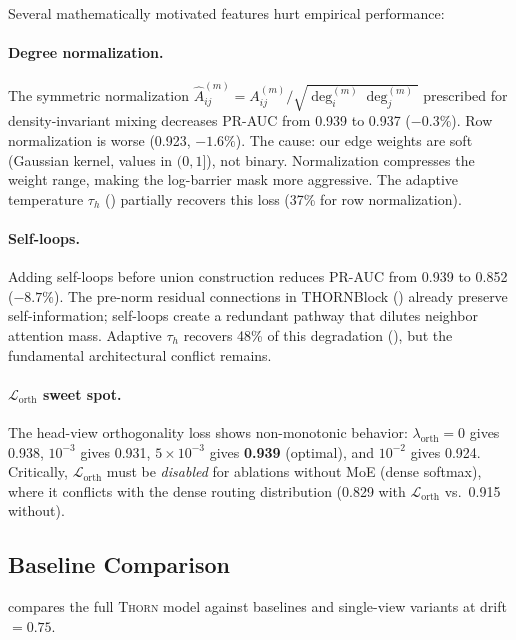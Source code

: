 \documentclass[11pt,a4paper]{article}
\newcommand{\thorn}{\textsc{Thorn}}
\newcommand{\calL}{\mathcal{L}}
\begin{document}
Several mathematically motivated features hurt empirical performance:

\paragraph{Degree normalization.}
The symmetric normalization
$\hat{A}_{ij}^{(m)} = A_{ij}^{(m)} / \sqrt{\deg_i^{(m)} \deg_j^{(m)}}$
prescribed for density-invariant mixing decreases PR-AUC from 0.939 to
0.937 ($-0.3\%$).
Row normalization is worse (0.923, $-1.6\%$).
The cause: our edge weights are soft (Gaussian kernel, values in
$(0, 1]$), not binary.
Normalization compresses the weight range, making the
log-barrier mask more aggressive.
The adaptive temperature $\tau_h$ () partially
recovers this loss (37\% for row normalization).

\paragraph{Self-loops.}
Adding self-loops before union construction reduces PR-AUC from 0.939 to
0.852 ($-8.7\%$).
The pre-norm residual connections in THORNBlock
() already preserve self-information; self-loops
create a redundant pathway that dilutes neighbor attention mass.
Adaptive $\tau_h$ recovers 48\% of this degradation
(), but the fundamental architectural conflict
remains.

\paragraph{$\calL_{\mathrm{orth}}$ sweet spot.}
The head-view orthogonality loss shows non-monotonic behavior:
$\lambda_{\mathrm{orth}} = 0$ gives 0.938, $10^{-3}$ gives 0.931,
$5 \times 10^{-3}$ gives \textbf{0.939} (optimal), and $10^{-2}$ gives
0.924.
Critically, $\calL_{\mathrm{orth}}$ must be \emph{disabled} for
ablations without MoE (dense softmax), where it conflicts with the dense
routing distribution (0.829 with $\calL_{\mathrm{orth}}$ vs.\ 0.915
without).

\subsection{Baseline Comparison}
\label{sec:baselines}

 compares the full \thorn{} model against baselines
and single-view variants at drift${}=0.75$.
\end{document}
